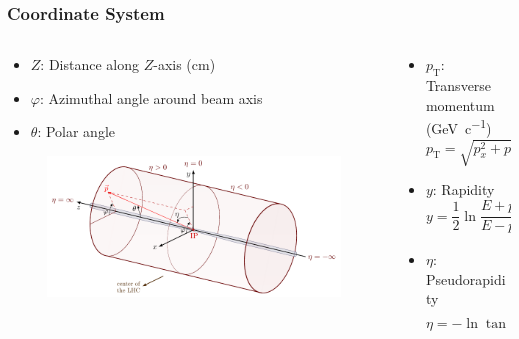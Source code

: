 \documentclass[10pt]{beamer}
\begin{document}
\begin{frame}
    \frametitle{Coordinate System}

    \begin{columns}[t]
        \begin{column}{0.6\textwidth}
            \begin{itemize}
                \item $Z$: Distance along $Z$-axis (\unit{\centi\metre})
                \item $\varphi$: Azimuthal angle around beam axis
                \item $\theta$: Polar angle
            \end{itemize}
            \begin{figure}[h]
                \begin{center}
                    \includegraphics[width=\textwidth]{Figs/coords.pdf}
                \end{center}
            \end{figure}
        \end{column}

        \begin{column}{0.4\textwidth}
            \begin{itemize}
                \item $p_{\mathrm{T}}$: Transverse momentum (\unit{\giga\electronvolt\per c})
                \begin{equation*}
                    p_{\mathrm{T}}=\sqrt{p_x^2+p_y^2}
                \end{equation*}
                \item $y$: Rapidity
                \begin{equation*}
                    y=\frac{1}{2}\ln \frac{E+p_z}{E-p_z}
                \end{equation*}
                \item $\eta$: Pseudorapidity
                \begin{equation*}
                    \eta=-\ln\tan\frac{\theta}{2}
                \end{equation*}
            \end{itemize}
        \end{column}
    \end{columns}

\end{frame}
\end{document}
